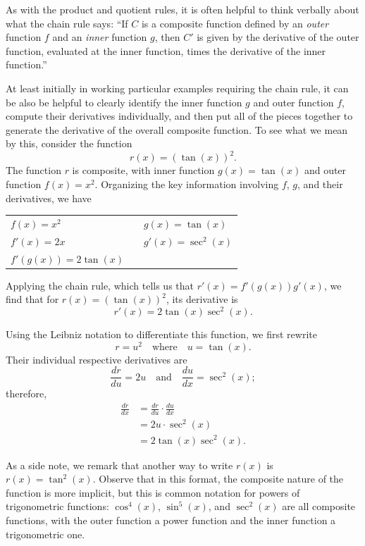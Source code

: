 As with the product and quotient rules, it is often helpful to think verbally about what the chain rule says: ``If $C$ is a composite function defined by an {\em outer} function $f$ and an {\em inner} function $g$, then $C'$ is given by the derivative of the outer function, evaluated at the inner function, times the derivative of the inner function.''  

At least initially in working particular examples requiring the chain rule, it can be also be helpful to clearly identify the inner function $g$ and outer function $f$, compute their derivatives individually, and then put all of the pieces together to generate the derivative of the overall composite function.  To see what we mean by this, consider the function
$$r(x) = (\tan(x))^2.$$
The function $r$ is composite, with inner function $g(x) = \tan(x)$ and outer function $f(x) = x^2$.  Organizing the key information involving $f$, $g$, and their derivatives, we have

\begin{center}
\begin{tabular}{lcl}
$f(x) = x^2$ & \hspace{0.5in} & $g(x) = \tan(x)$ \\
$f'(x) = 2x$ & \hspace{0.5in} & $g'(x) = \sec^2(x)$ \\
$f'(g(x)) = 2\tan(x)$ & \hspace{0.5in} & \ \\
\end{tabular}
\end{center}

Applying the chain rule, which tells us that $r'(x) = f'(g(x)) g'(x)$, we find that for $r(x) = (\tan(x))^2$, its derivative is
$$r'(x) = 2\tan(x) \sec^2(x).$$

Using the Leibniz notation to differentiate this function, we first rewrite
\[ r = u^2 \quad \mbox{where} \quad u = \tan(x). \]
Their individual respective derivatives are
\[ \frac{dr}{du} = 2u \quad \mbox{and} \quad \frac{du}{dx} = \sec^2(x); \]
therefore,
\begin{align*}
\frac{dr}{dx} &= \frac{dr}{du} \cdot \frac{du}{dx} \\
&= 2u \cdot \sec^2(x) \\
&= 2 \tan(x) \sec^2(x).
\end{align*}

As a side note, we remark that another way to write $r(x)$ is $r(x) = \tan^2(x)$.  Observe that in this format, the composite nature of the function is more implicit, but this is common notation for powers of trigonometric functions:  $\cos^4(x)$, $\sin^5(x)$, and $\sec^2(x)$ are all composite functions, with the outer function a power function and the inner function a trigonometric one.

